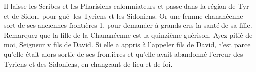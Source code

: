 Il laisse les Scribes et les Pharisiens calomniateurs et passe dans la région de Tyr et de Sidon, pour gué- les Tyriens et les Sidoniens. Or une femme chananéenne sort de ses anciennes frontières 1, pour demander à grands cris la santé de sa fille. Remarquez que la fille de la Chananéenne est la quinzième guérison. Ayez pitié de moi, Seigneur y fils de David. Si elle a appris à l’appeler fils de David, c’est parce qu’elle était alors sortie de ses frontières et qu’elle avait abandonné l’erreur des Tyriens et des Sidoniens, en changeant de lieu et de foi.
